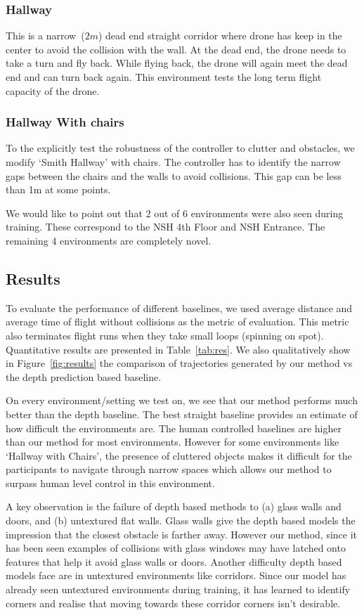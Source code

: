 \documentclass[letterpaper, 10 pt, conference]{ieeeconf}  %
\begin{document}
\subsubsection{Hallway}
This is a narrow~($2m$) dead end straight corridor where drone has keep in the center to avoid the collision with the wall. At the dead end, the drone needs to take a turn and fly back. While flying back, the drone will again meet the dead end and can turn back again. This environment tests the long term flight capacity of the drone.  

\subsubsection{Hallway With chairs}
To the explicitly test the robustness of the controller to clutter and obstacles, we modify `Smith Hallway' with chairs. The controller has to identify the narrow gaps between the chairs and the walls to avoid collisions. This gap can be less than 1m at some points.

We would like to point out that 2 out of 6 environments were also seen during training. These correspond to the NSH 4th Floor and NSH Entrance. The remaining 4 environments are completely novel.

\subsection{Results}
To evaluate the performance of different baselines, we used average distance and average time of flight without collisions as the metric of evaluation. This metric also terminates flight runs when they take small loops (spinning on spot). Quantitative results are presented in Table~\ref{tab:res}. We also qualitatively show in Figure~\ref{fig:results} the comparison of trajectories generated by our method vs the depth prediction based baseline.

On every environment/setting we test on, we see that our method performs much better than the depth baseline. The best straight baseline provides an estimate of how difficult the environments are. The human controlled baselines are higher than our method for most environments. However for some environments like `Hallway with Chairs', the presence of cluttered objects makes it difficult for the participants to navigate through narrow spaces which allows our method to surpass human level control in this environment. 

A key observation is the failure of depth based methods to (a) glass walls and doors, and (b) untextured flat walls. Glass walls give the depth based models the impression that the closest obstacle is farther away. However our method, since it has been seen examples of collisions with glass windows may have latched onto features that help it avoid glass walls or doors. Another difficulty depth based models face are in untextured environments like corridors. Since our model has already seen untextured environments during training, it has learned to identify corners and realise that moving towards these corridor corners isn't desirable.
\end{document}
